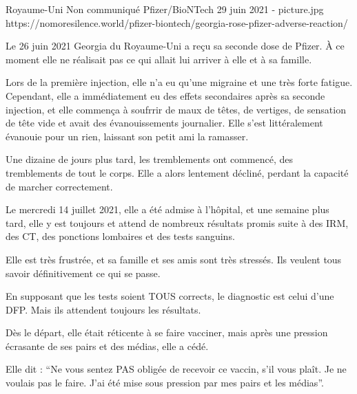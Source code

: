 {Royaume-Uni}
{Non communiqué}
{Pfizer/BioNTech}
{29 juin 2021}
{-}
{picture.jpg}
{https://nomoresilence.world/pfizer-biontech/georgia-rose-pfizer-adverse-reaction/}
{

Le 26 juin 2021 Georgia du Royaume-Uni a reçu sa seconde dose de Pfizer. À ce
moment elle ne réalisait pas ce qui allait lui arriver à elle et à sa famille.

Lors de la première injection, elle n'a eu qu'une migraine et une très forte
fatigue. Cependant, elle a immédiatement eu des effets secondaires après sa
seconde injection, et elle commença à soufrrir de maux de têtes, de vertiges, de
sensation de tête vide et avait des évanouissements journalier. Elle s'est
littéralement évanouie pour un rien, laissant son petit ami la ramasser.

Une dizaine de jours plus tard, les tremblements ont commencé, des tremblements
de tout le corps. Elle a alors lentement décliné, perdant la capacité de marcher
correctement.

Le mercredi 14 juillet 2021, elle a été admise à l'hôpital, et une semaine plus
tard, elle y est toujours et attend de nombreux résultats promis suite à des
IRM, des CT, des ponctions lombaires et des tests sanguins.

Elle est très frustrée, et sa famille et ses amis sont très stressés. Ils
veulent tous savoir définitivement ce qui se passe.

En supposant que les tests soient TOUS corrects, le diagnostic est celui d'une
DFP. Mais ils attendent toujours les résultats.

Dès le départ, elle était réticente à se faire vacciner, mais après une pression
écrasante de ses pairs et des médias, elle a cédé.

Elle dit : “Ne vous sentez PAS obligée de recevoir ce vaccin, s'il vous
plaît. Je ne voulais pas le faire. J'ai été mise sous pression par mes pairs et
les médias”.

}
